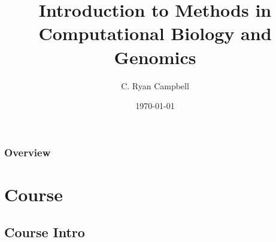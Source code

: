 \documentclass{beamer}
\title[Course Intro]{Introduction to Methods in Computational Biology and Genomics} %
\author{C. Ryan Campbell} %
\institute[Duke] %
{
Duke University \\ %
\medskip
\textit{c.ryan.campbell@duke.edu} %
}
\date{\today} %
\begin{document}
\begin{frame}
\titlepage %
\end{frame}

\begin{frame}
\frametitle{Overview} %
\tableofcontents %
\end{frame}


\section{Course} %

\subsection{Course Intro} %
\end{document}
